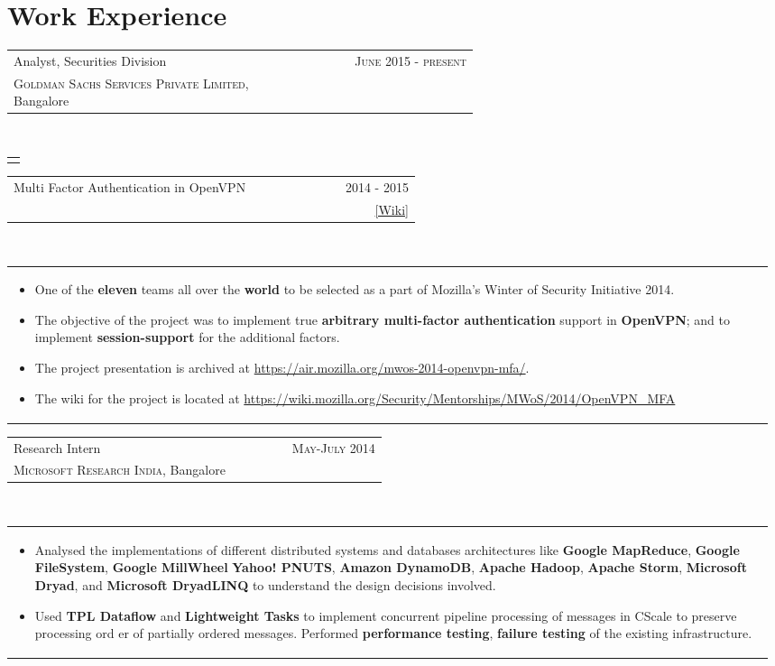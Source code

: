 \documentclass[a4paper]{article} %
\newcommand{\verticalspacing}{-0.25cm}
\newcommand{\bulletspace}{0.7cm}
\newcommand{\projectheadspacing}{6.9cm}
\newcommand{\cproject}[5]{%
    \begin{tabular}{p{0.60\linewidth}r}
        \textcolor{NavyBlue}{\small #2} & \multicolumn{1}{m{ \projectheadspacing{} }}{\raggedleft \small {\textsc{#1}}}\\
        \small {#3} & \small {#4}
    \end{tabular}\\
    \begin{tabular}{p{0.98\linewidth}}
    \vspace{-0.3cm}
        \small{#5}
    \end{tabular}
    \vspace{\verticalspacing{}}
}
\begin{document}
\section{Work Experience}
\cproject
      {June 2015 - present}
      {Analyst, Securities Division}
      {\textsc{Goldman Sachs Services Private Limited}, Bangalore}
      {}
      {%
      }

\cproject
    {2014 - 2015}
    {Multi Factor Authentication in OpenVPN}
    {\textsc{\raggedright Mozilla Winter of Security}, Guillaume Destuynder, Professor Dheeraj Sanghi}
    {\href{https://wiki.mozilla.org/Security/Mentorships/MWoS/2014/OpenVPN\_MFA} {[Wiki]} }
    {%
        \begin{itemize}[leftmargin=\bulletspace{}]
          \item One of the \textbf{eleven} teams all over the \textbf{world} to be selected as a part of Mozilla's Winter of Security Initiative 2014.
          \item The objective of the project was to implement true \textbf{arbitrary multi-factor authentication} support in
              \textbf{OpenVPN}; and to implement \textbf{session-support} for the additional factors.
          \item The project presentation is archived at
              \href{https://air.mozilla.org/mwos-2014-openvpn-mfa/}{https://air.mozilla.org/mwos-2014-openvpn-mfa/}.
          \item The wiki for the project is located at \href{https://wiki.mozilla.org/Security/Mentorships/MWoS/2014/OpenVPN\_MFA} {https://wiki.mozilla.org/Security/Mentorships/MWoS/2014/OpenVPN\_MFA}
      \end{itemize}
    }


\cproject
      {May-July 2014}
      {Research Intern}
      {\textsc{Microsoft Research India}, Bangalore}
      {}
      {%
          \begin{itemize}[leftmargin=\bulletspace{}]
              \item Analysed the implementations of different distributed systems and databases architectures like
                  \textbf{Google MapReduce}, \textbf{Google FileSystem}, \textbf{Google MillWheel} \textbf{Yahoo! PNUTS},
                  \textbf{Amazon DynamoDB}, \textbf{Apache Hadoop}, \textbf{Apache Storm}, \textbf{Microsoft Dryad},
                  and \textbf{Microsoft DryadLINQ} to understand the design decisions involved.
              \item Used \textbf{TPL Dataflow} and \textbf{Lightweight Tasks} to implement concurrent pipeline
                  processing of messages in CScale to preserve processing ord
                  er of partially ordered messages.
                  Performed \textbf{performance testing}, \textbf{failure testing} of the existing infrastructure.
          \end{itemize}
     }
\end{document}
